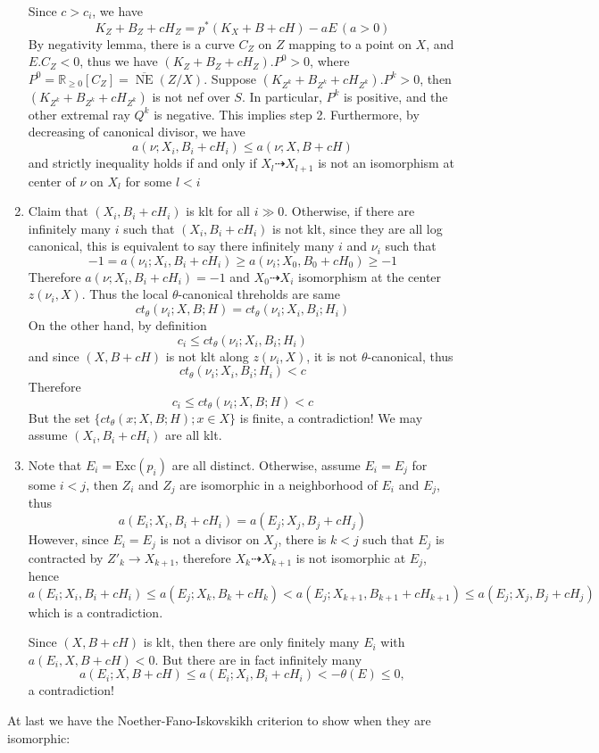 \documentclass{article}
\begin{document}
\begin{enumerate}[Step 1]
  Since $ c>c_i $, we have 
  \[ K_Z+B_Z+cH_Z=p^*(K_X+B+cH)-aE\,(a>0) \]
  By negativity lemma, there is a curve $ C_Z $ on $ Z $ mapping to a point on $ X $, and $ E.C_Z<0 $, thus we have $ (K_Z+B_Z+cH_Z).P^0>0 $, where $ P^0=\mathbb{R}_{\geqslant0}[C_Z]=\overline{\operatorname{NE}}(Z/X) $. Suppose
  $(K_{Z^k}+B_{Z^k}+cH_{Z^k}).P^k>0$, then $ (K_{Z^k}+B_{Z^k}+cH_{Z^k}) $ is not nef over $ S $. In particular,  $ P^k $ is positive, and the other extremal ray $ Q^k $ is negative. This implies step 2. 
  Furthermore, by decreasing of canonical divisor, we have
  \[ a(\nu;X_i,B_i+cH_i)\leqslant a(\nu;X,B+cH) \]
  and strictly inequality holds if and only if $ X_l\dashrightarrow X_{l+1} $ is not an isomorphism at center of $ \nu $ on $ X_l $ for some $ l<i $
  \item Claim that $ (X_i,B_i+cH_i) $ is klt for all $ i\gg 0 $. Otherwise, if there are infinitely many $ i $ such that $ (X_i,B_i+cH_i) $ is not klt, since they are all log canonical, this is equivalent to say there infinitely many $ i $ and $ \nu_i $ such that
  \[ -1=a(\nu_i;X_i,B_i+cH_i)\geqslant a(\nu_i;X_0,B_0+cH_0)\geqslant -1  \]
  Therefore $ a(\nu;X_i,B_i+cH_i)=-1 $ and $ X_0\dashrightarrow X_i $ isomorphism at the center $ z(\nu_i,X) $. Thus the local $ \theta $-canonical threholds are same
\[ ct_{\theta}(\nu_i;X,B;H)=ct_{\theta}(\nu_i;X_i,B_i;H_i) \]
  On the other hand, by definition
  \[ c_i \leqslant ct_{\theta}(\nu_i;X_i,B_i;H_i) \]
  and since $ (X,B+cH) $ is not klt along $ z(\nu_i,X) $, it is not $ \theta $-canonical, thus
  \[ ct_{\theta}(\nu_i;X_i,B_i;H_i)<c \]
  Therefore
  \[ c_i\leqslant ct_{\theta}(\nu_i;X,B;H)<c \]
  But the set $\{ ct_{\theta}(x;X,B;H);x\in X\} $ is finite, a contradiction! We may assume $ (X_i,B_i+cH_i) $ are all klt.
  \item Note that $ E_i=\mathrm{Exc}(p_i) $ are all distinct. Otherwise, assume $ E_i=E_j $ for some $ i<j $, then $ Z_i $ and $ Z_j $ are isomorphic in a neighborhood of $ E_i $ and $ E_j $, thus 
  \[ a(E_i;X_i,B_i+cH_i)=a(E_j;X_j,B_j+cH_j) \]
  However, since $ E_i=E_j $ is not a divisor on $ X_j $, there is $ k<j $ such that $ E_j $ is contracted by $ Z'_k\to X_{k+1} $, therefore $ X_k\dashrightarrow X_{k+1} $ is not isomorphic at $ E_j $, hence 
  \[ a(E_i;X_i,B_i+cH_i)\leqslant a(E_j;X_k,B_k+cH_k)<a(E_j;X_{k+1},B_{k+1}+cH_{k+1})\leqslant a(E_j;X_j,B_j+cH_j) \]  
  which is a contradiction.
  
  Since $ (X,B+cH) $ is klt, then there are only finitely many $ E_i $ with $ a(E_i,X,B+cH)<0 $. But there are in fact infinitely many
  \[ a(E_i;X,B+cH)\leqslant  a(E_i;X_i,B_i+cH_i)<-\theta (E)\leqslant 0 ,\] 
  a contradiction! 
\end{enumerate}
At last we have the Noether-Fano-Iskovskikh criterion to show when they are isomorphic:
\end{document}

